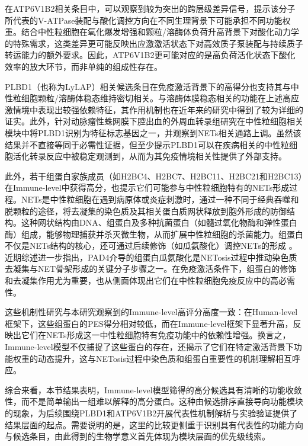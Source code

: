 在ATP6V1B2相关条目中，可以观察到较为突出的跨层级差异信号，提示该分子所代表的V-ATPase装配与酸化调控方向在不同生理背景下可能承担不同功能权重。结合中性粒细胞在氧化爆发增强和颗粒/溶酶体负荷升高背景下对酸化动力学的特殊需求，这类差异更可能反映出应激激活状态下对高效质子泵装配与持续质子转运能力的额外要求。因此，ATP6V1B2更可能对应的是高负荷活化状态下酸化效率的放大环节，而非单纯的组成性存在。

PLBD1（也称为LyLAP）相关候选条目在免疫激活背景下的高得分也支持其与中性粒细胞颗粒/溶酶体稳态维持密切相关。与溶酶体膜稳态相关的功能在上述高应激情境中表现出较强依赖特征，其作用机制也在近年来的研究中得到了较为详细的证实\cite{jain2025leucine}。此外，针对动脉瘤性蛛网膜下腔出血的外周血转录组研究在中性粒细胞相关模块中将PLBD1识别为特征标志基因之一，并观察到NETs相关通路上调\cite{weng2022specific}。虽然该结果并不直接等同于必需性证据，但至少提示PLBD1可以在疾病相关的中性粒细胞活化转录反应中被稳定观测到，从而为其免疫情境相关性提供了外部支持。

此外，若干组蛋白家族成员（如H2BC4、H2BC7、H2BC11、H2BC21和H2BC13）在Immune-level中获得高分，也提示它们可能参与中性粒细胞特有的NETs形成过程。NETs是中性粒细胞在遇到病原体或炎症刺激时，通过一种不同于经典吞噬和脱颗粒的途径，将去凝集的染色质及其相关蛋白质网状释放到胞外形成的防御结构。这种网状结构由DNA、组蛋白及多种抗菌蛋白（如髓过氧化物酶和弹性蛋白酶）组成，能够物理捕获并杀灭微生物，从而扩展中性粒细胞的杀菌能力\cite{shahzad2025neutrophil}。组蛋白不仅是NETs结构的核心，还可通过后续修饰（如瓜氨酸化）调控NETs的形成 \cite{hamam2019histone}。近期综述进一步指出，PAD4介导的组蛋白瓜氨酸化是NETosis过程中推动染色质去凝集与NET骨架形成的关键分子步骤之一\cite{liu2024pad4}。在免疫激活条件下，组蛋白的修饰和去凝集作用尤为重要，也从侧面体现出它们在中性粒细胞免疫反应中的高必需性。

这些机制性研究与本研究观察到的Immune-level高评分高度一致：在Human-level框架下，这些组蛋白的PES得分相对较低，而在Immune-level框架下显著升高，反映出它们在NETs形成这一中性粒细胞特有免疫功能中的依赖性增强。换言之，Immune-level模型不仅捕捉了这些蛋白的存在，还揭示了它们在特定激活背景下功能权重的动态提升，这与NETosis过程中染色质和组蛋白重要性的机制理解相互呼应。

综合来看，本节结果表明，Immune-level模型筛得的高分候选具有清晰的功能收敛性，而不是简单输出一组难以解释的高分蛋白。这种由候选排序直接导向功能模块的现象，为后续围绕PLBD1和ATP6V1B2开展代表性机制解析与实验验证提供了结果层面的起点。需要说明的是，这里的比较更侧重于识别具有代表性的功能方向与候选条目，由此得到的生物学意义首先体现为模块层面的优先级线索。

